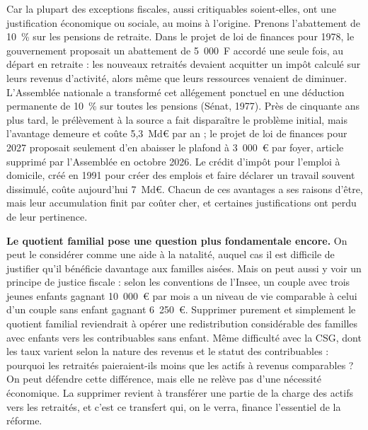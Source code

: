 \documentclass[11pt,a4paper]{article}
\begin{document}
Car la plupart des exceptions fiscales, aussi critiquables soient-elles, ont une justification
économique ou sociale, au moins à l'origine. Prenons l'abattement de 10~\% sur les pensions de retraite.
Dans le projet de loi de finances pour 1978, le gouvernement proposait un abattement de 5~000~F accordé une
seule fois, au départ en retraite : les nouveaux retraités devaient acquitter un impôt calculé sur leurs
revenus d'activité, alors même que leurs ressources venaient de diminuer. L'Assemblée nationale a
transformé cet allégement ponctuel en une déduction permanente de 10~\% sur toutes les pensions (Sénat,
1977). Près de cinquante ans plus tard, le prélèvement à la source a fait disparaître le problème initial,
mais l'avantage demeure et coûte 5,3~Md€ par an ; le projet de loi de finances pour 2027 proposait seulement
d'en abaisser le plafond à 3~000~€ par foyer, article supprimé par l'Assemblée en octobre 2026. Le crédit d'impôt pour l'emploi à domicile, créé en 1991
pour créer des emplois et faire déclarer un travail souvent dissimulé, coûte aujourd'hui 7~Md€. Chacun de
ces avantages a ses raisons d'être, mais leur accumulation finit par coûter cher, et certaines
justifications ont perdu de leur pertinence.

\textbf{Le quotient familial pose une question plus fondamentale encore.} On peut le considérer comme une
aide à la natalité, auquel cas il est difficile de justifier qu'il bénéficie davantage aux familles
aisées. Mais on peut aussi y voir un principe de justice fiscale : selon les conventions de l'Insee, un
couple avec trois jeunes enfants gagnant 10~000~€ par mois a un niveau de vie comparable à celui d'un
couple sans enfant gagnant 6~250~€. Supprimer purement et simplement le quotient familial reviendrait à
opérer une redistribution considérable des familles avec enfants vers les contribuables sans enfant.
Même difficulté avec la CSG, dont les taux varient selon la nature des revenus et le statut des
contribuables : pourquoi les retraités paieraient-ils moins que les actifs à revenus comparables ? On
peut défendre cette différence, mais elle ne relève pas d'une nécessité économique. La supprimer revient
à transférer une partie de la charge des actifs vers les retraités, et c'est ce transfert qui, on le
verra, finance l'essentiel de la réforme.
\end{document}
